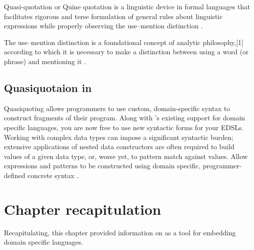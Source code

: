 \documentclass[thesis-solanki.tex]{subfiles}
\begin{document}
Quasi-quotation or Quine quotation is a linguistic device in formal languages that facilitates rigorous and terse formulation of general 
rules about linguistic expressions while properly observing the use--mention distinction \cite{wikiquasi}.

The use--mention distinction is a foundational concept of analytic philosophy,[1] according to which it is necessary to make a distinction 
between using a word (or phrase) and mentioning it \cite{website:usementiondistinctionwiki}.


\subsection{Quasiquotaion in }

Quasiquoting allows programmers to use custom, domain-specific syntax to construct fragments of their program. Along with 
's existing support for domain specific languages, you are now free to use new syntactic forms for your EDSLs. Working 
with complex data types can impose a significant syntactic burden; extensive applications of nested data constructors are often required to 
build values of a given data type, or, worse yet, to pattern match against values. Allow  expressions and patterns to be 
constructed using domain specific, programmer-defined concrete syntax \cite{haskellquasi, mainland2007s}.



\section{Chapter recapitulation}
Recapitulating, this chapter provided information on  as a tool for embedding domain specific languages.


\ifMain
\begin{scope}
  \nolinenumbers
  \enotesize
  \par
  \begin{singlespace}
  \setlength{\parskip}{12pt plus 2pt minus 1pt}
  \theendnotes
  \par
  \end{singlespace}
\end{scope}
\fi
\end{document}
